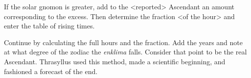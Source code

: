 If the solar gnomon is greater, add to the <reported> Ascendant an amount corresponding to the excess. Then determine the fraction <of the hour> and enter the table of rising times. 

Continue by calculating the full hours and the fraction. Add the years and note at what degree of the zodiac the \textit{enklima} falls. Consider that point to be the real Ascendant. Thrasyllus used this method, made a scientific beginning, and fashioned a forecast of the end.

\newpage